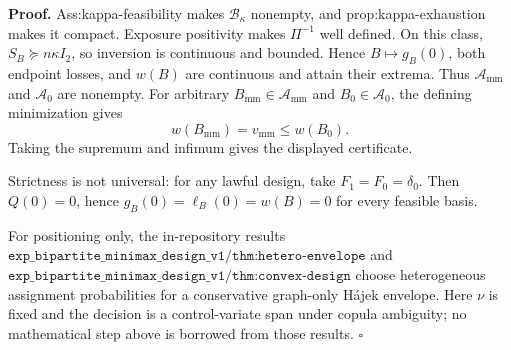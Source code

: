 \textbf{Proof.}
Ass:kappa-feasibility makes \(\mathcal B_\kappa\) nonempty, and prop:kappa-exhaustion makes it compact.  Exposure positivity makes \(\Pi^{-1}\) well defined.  On this class, \(S_B\succeq n\kappa I_2\), so inversion is continuous and bounded.  Hence \(B\mapsto g_B(0)\), both endpoint losses, and \(w(B)\) are continuous and attain their extrema.  Thus \(\mathcal A_{\mathrm{mm}}\) and \(\mathcal A_0\) are nonempty.  For arbitrary \(B_{\mathrm{mm}}\in\mathcal A_{\mathrm{mm}}\) and \(B_0\in\mathcal A_0\), the defining minimization gives
\[
 w(B_{\mathrm{mm}})=v_{\mathrm{mm}}\le w(B_0).
\]
Taking the supremum and infimum gives the displayed certificate.

Strictness is not universal: for any lawful design, take \(F_1=F_0=\delta_0\).  Then \(Q(0)=0\), hence \(g_B(0)=\ell_B(0)=w(B)=0\) for every feasible basis.

For positioning only, the in-repository results \(\texttt{exp\_bipartite\_minimax\_design\_v1/thm:hetero-envelope}\) and \(\texttt{exp\_bipartite\_minimax\_design\_v1/thm:convex-design}\) choose heterogeneous assignment probabilities for a conservative graph-only H\'ajek envelope.  Here \(\nu\) is fixed and the decision is a control-variate span under copula ambiguity; no mathematical step above is borrowed from those results. \(\square\)